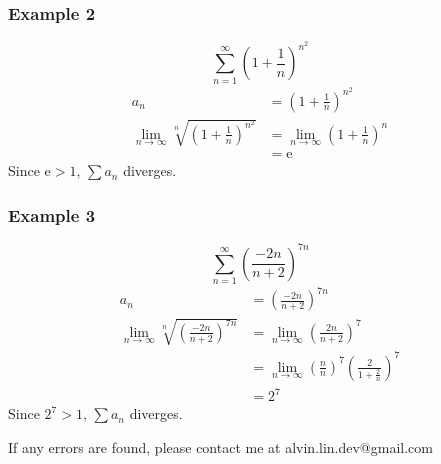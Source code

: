 \documentclass[letterpaper, 12pt]{article}
\newcommand*{\e}{\mathrm{e}}
\begin{document}
\subsubsection*{Example 2}
\[ \sum_{n=1}^{\infty}(1+\frac{1}{n})^{n^{2}} \]
\begin{align*}
  a_{n} &= (1+\frac{1}{n})^{n^{2}} \\
  \lim_{n\to\infty}\sqrt[n]{(1+\frac{1}{n})^{n^{2}}} &=
    \lim_{n\to\infty}(1+\frac{1}{n})^{n} \\
  &= \e
\end{align*}
Since \( \e > 1 \), \( \sum{a_{n}} \) diverges.

\subsubsection*{Example 3}
\[ \sum_{n=1}^{\infty}(\frac{-2n}{n+2})^{7n} \]
\begin{align*}
  a_{n} &= (\frac{-2n}{n+2})^{7n} \\
  \lim_{n\to\infty}\sqrt[n]{(\frac{-2n}{n+2})^{7n}} &=
    \lim_{n\to\infty}(\frac{2n}{n+2})^{7} \\
  &= \lim_{n\to\infty}(\frac{n}{n})^{7}(\frac{2}{1+\frac{2}{n}})^{7} \\
  &= 2^{7}
\end{align*}
Since \( 2^{7} > 1 \), \( \sum{a_{n}} \) diverges.

\begin{center}
  If any errors are found, please contact me at alvin.lin.dev@gmail.com
\end{center}
\end{document}
